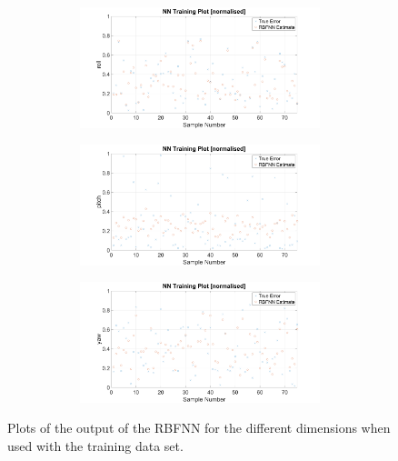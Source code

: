 \begin{figure}
\begin{subfigure}{0.48\textwidth}
\begin{subfigure}{\textwidth}
    \end{subfigure}
    \caption{}
  \end{subfigure}
  \begin{subfigure}{0.48\textwidth}
    \begin{subfigure}{\textwidth}
      \includegraphics[clip, trim = 100 0 100 0, width=\textwidth]{figures/chapter4/scatter_tr_roll}
    \end{subfigure}
    \begin{subfigure}{\textwidth}
      \includegraphics[clip, trim = 100 0 100 0, width=\textwidth]{figures/chapter4/scatter_tr_pitch}
    \end{subfigure}
    \begin{subfigure}{\textwidth}
      \includegraphics[clip, trim = 100 0 100 0, width=\textwidth]{figures/chapter4/scatter_tr_yaw}
    \end{subfigure}
    \caption{}
  \end{subfigure}
  \caption[The output of the RBFNN when used with the training set input.]{Plots of the output of the RBFNN for the different dimensions when used with the training data set.}
  \label{fig:chap4-rbf-train}
\end{figure}

